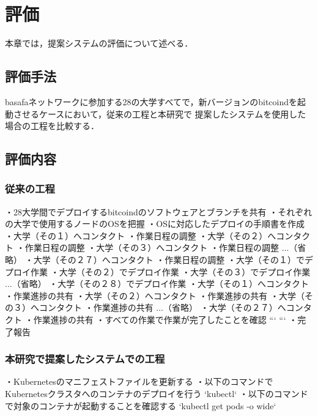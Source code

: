\chapter{評価}
\label{evaluation}
本章では，提案システムの評価について述べる．

\section{評価手法}
\label{evaluation:method}

basafaネットワークに参加する28の大学すべてで，新バージョンのbitcoindを起動させるケースにおいて，従来の工程と本研究で
提案したシステムを使用した場合の工程を比較する．

\section{評価内容}
\label{evaluation:content}

\subsection{従来の工程}

・28大学間でデプロイするbitcoindのソフトウェアとブランチを共有
・それぞれの大学で使用するノードのOSを把握
・OSに対応したデプロイの手順書を作成
・大学（その１）へコンタクト
    ・作業日程の調整
・大学（その２）へコンタクト
    ・作業日程の調整
・大学（その３）へコンタクト
    ・作業日程の調整
...（省略）
・大学（その２７）へコンタクト
    ・作業日程の調整
・大学（その１）でデプロイ作業
・大学（その２）でデプロイ作業
・大学（その３）でデプロイ作業
...（省略）
・大学（その２８）でデプロイ作業
・大学（その１）へコンタクト
    ・作業進捗の共有
・大学（その２）へコンタクト
    ・作業進捗の共有
・大学（その３）へコンタクト
    ・作業進捗の共有
...（省略）
・大学（その２７）へコンタクト
    ・作業進捗の共有
・すべての作業で作業が完了したことを確認
```
```
・完了報告

\subsection{本研究で提案したシステムでの工程}

・Kubernetesのマニフェストファイルを更新する
・以下のコマンドでKubernetesクラスタへのコンテナのデプロイを行う
`kubectl`
・以下のコマンドで対象のコンテナが起動することを確認する
`kubectl get pods -o wide`

